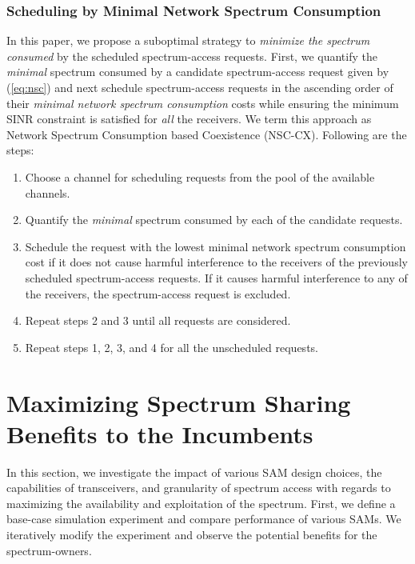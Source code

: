 \documentclass[12pt, draftclsnofoot, onecolumn]{IEEEtran}
\begin{document}
\subsubsection{Scheduling by Minimal Network Spectrum Consumption}
In this paper, we propose a suboptimal strategy to \textit{minimize the spectrum consumed} by the scheduled spectrum-access requests. First, we quantify the \textit{minimal} spectrum consumed by a candidate spectrum-access request given by (\ref{eq:nsc}) and next schedule spectrum-access requests in the ascending order of their \textit{minimal network spectrum consumption} costs while ensuring the minimum SINR constraint is satisfied for \textit{all} the receivers. We term this approach as Network Spectrum Consumption based Coexistence (NSC-CX). Following are the steps:
\begin{enumerate}
  \item Choose a channel for scheduling requests from the pool of the available channels.
	\item Quantify the \textit{minimal} spectrum consumed by each of the candidate requests.
  \item Schedule the request with the lowest minimal network spectrum consumption cost if it does not cause harmful interference to the receivers of the previously scheduled spectrum-access requests. If it causes harmful interference to any of the receivers, the spectrum-access request is excluded. \item Repeat steps 2 and 3 until all requests are considered. 
  \item Repeat steps 1, 2, 3, and 4 for all the unscheduled requests.\end{enumerate}


\section{Maximizing Spectrum Sharing Benefits to the Incumbents}

In this section, we investigate the impact of various SAM design choices, the capabilities of transceivers, and granularity of spectrum access with regards to maximizing the availability and exploitation of the spectrum. First, we define a base-case simulation experiment and compare performance of various SAMs. We iteratively modify the experiment and observe the potential benefits for the spectrum-owners.
\end{document}
